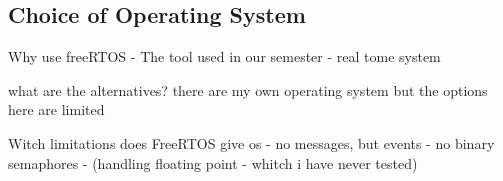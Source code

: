 \subsection{Choice of Operating System}
\label{sec:ChoiceofOperatingSystem}

Why use freeRTOS
- The tool used in our semester
- real tome system

what are the alternatives? 
there are my own operating system but the options here are limited

Witch limitations does FreeRTOS give os 
- no messages, but events
- no binary semaphores 
- (handling floating point - whitch i have never tested)

